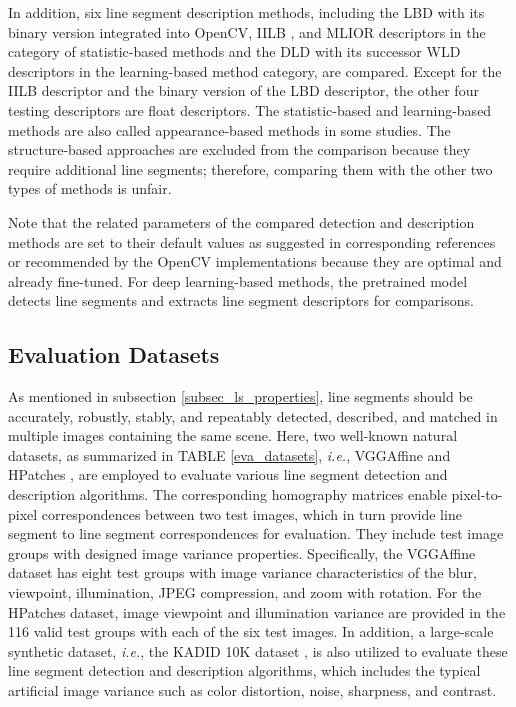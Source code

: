 \documentclass[journal,compsoc]{IEEEtran}
\begin{document}
In addition, six line segment description methods, including the LBD \cite{LBD} with its binary version integrated into OpenCV, IILB \cite{IILB}, and MLIOR \cite{ALineMatchingMethodBasedonMultipleIntensityOrderingwithUniformlySpacedSampling} descriptors in the category of statistic-based methods and the DLD \cite{DLD} with its successor WLD \cite{WLD} descriptors in the learning-based method category, are compared. Except for the IILB descriptor and the binary version of the LBD descriptor, the other four testing descriptors are float descriptors. The statistic-based and learning-based methods are also called appearance-based methods in some studies. The structure-based approaches are excluded from the comparison because they require additional line segments; therefore, comparing them with the other two types of methods is unfair.

Note that the related parameters of the compared detection and description methods are set to their default values as suggested in corresponding references or recommended by the OpenCV implementations because they are optimal and already fine-tuned. For deep learning-based methods, the pretrained model detects line segments and extracts line segment descriptors for comparisons.


\subsection{Evaluation Datasets}
\label{subsec_performance_dataset}
As mentioned in subsection \ref{subsec_ls_properties}, line segments should be accurately, robustly, stably, and repeatably detected, described, and matched in multiple images containing the same scene. Here, two well-known natural datasets, as summarized in TABLE \ref{eva_datasets}, \textit{i.e.}, VGGAffine \cite{vggaffine} and HPatches \cite{HPatches}, are employed to evaluate various line segment detection and description algorithms. The corresponding homography matrices enable pixel-to-pixel correspondences between two test images, which in turn provide line segment to line segment correspondences for evaluation. They include test image groups with designed image variance properties. Specifically, the VGGAffine dataset has eight test groups with image variance characteristics of the blur, viewpoint, illumination, JPEG compression, and zoom with rotation. For the HPatches dataset, image viewpoint and illumination variance are provided in the 116 valid test groups with each of the six test images. In addition, a large-scale synthetic dataset, \textit{i.e.}, the KADID 10K dataset \cite{KADID}, is also utilized to evaluate these line segment detection and description algorithms, which includes the typical artificial image variance such as color distortion, noise, sharpness, and contrast.
\end{document}
